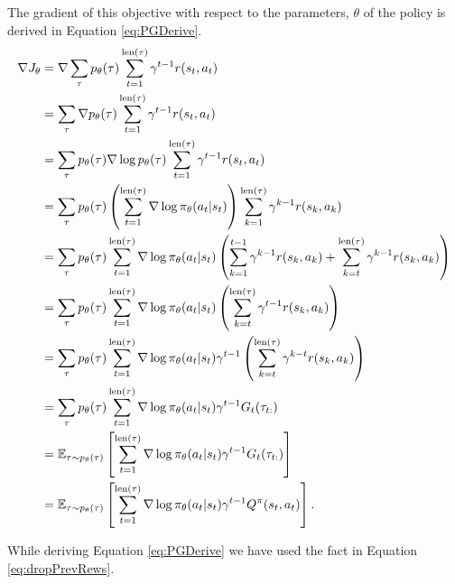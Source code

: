 \documentclass{report}
\numberwithin{equation}{section}
\numberwithin{figure}{section}
\numberwithin{table}{section}
\numberwithin{algorithm}{section}
\begin{document}
The gradient of this objective with respect to the parameters, $\theta$ 
of the policy is derived in Equation \ref{eq:PGDerive}.
\begin{align}\label{eq:PGDerive}
  \nabla J_\theta&=\nabla\sum_{\tau}p_{\theta}(\tau)\sum_{t=1}^{\text{len}(\tau)}\gamma^{t-1}r(s_t, a_t)\notag\\
  &=\sum_{\tau}\nabla p_{\theta}(\tau)\sum_{t=1}^{\text{len}(\tau)}\gamma^{t-1}r(s_t, a_t)\notag\\
  &=\sum_{\tau}p_{\theta}(\tau)\nabla \log p_\theta(\tau)\sum_{t=1}^{\text{len}(\tau)}\gamma^{t-1}r(s_t, a_t)\notag\\
  &=\sum_{\tau}p_{\theta}(\tau)\left(
    \sum_{t=1}^{\text{len}(\tau)}\nabla \log \pi_\theta(a_t|s_t)
  \right)\sum_{k=1}^{\text{len}(\tau)}\gamma^{k-1}r(s_k, a_k)\notag\\
  &=\sum_{\tau}p_\theta(\tau)\sum_{t=1}^{\text{len}(\tau)}\nabla \log \pi_\theta(a_t|s_t)
  \left(
    \sum_{k=1}^{t-1}\gamma^{k-1}r(s_k, a_k)
    + \sum_{k=t}^{\text{len}(\tau)}\gamma^{k-1}r(s_k, a_k)
  \right)\notag\\
  &=\sum_{\tau}p_\theta(\tau)\sum_{t=1}^{\text{len}(\tau)}\nabla \log \pi_\theta(a_t|s_t)
  \left(
    \sum_{k=t}^{\text{len}(\tau)}\gamma^{t-1}r(s_k, a_k)
  \right)\notag\\
  &=\sum_{\tau}p_\theta(\tau)\sum_{t=1}^{\text{len}(\tau)}\nabla \log \pi_\theta(a_t|s_t)
  \gamma^{t-1}\left(
    \sum_{k=t}^{\text{len}(\tau)}\gamma^{k-t}r(s_k, a_k)
  \right)\notag\\
  &=\sum_{\tau}p_\theta(\tau)\sum_{t=1}^{\text{len}(\tau)}\nabla \log \pi_\theta(a_t|s_t)
  \gamma^{t-1}G_t(\tau_{t:})\notag\\
  &=\mathbb{E}_{\tau\sim p_\theta(\tau)}\left[\sum_{t=1}^{\text{len}(\tau)}\nabla \log \pi_\theta(a_t|s_t)
  \gamma^{t-1}G_t(\tau_{t:})\right]\notag\\
  &=\mathbb{E}_{\tau\sim p_\theta(\tau)}\left[\sum_{t=1}^{\text{len}(\tau)}\nabla \log \pi_\theta(a_t|s_t)
  \gamma^{t-1}Q^{\pi}(s_t, a_t)\right].
\end{align}

While deriving Equation \ref{eq:PGDerive} we have used the 
fact in Equation \ref{eq:dropPrevRews}.
\end{document}
